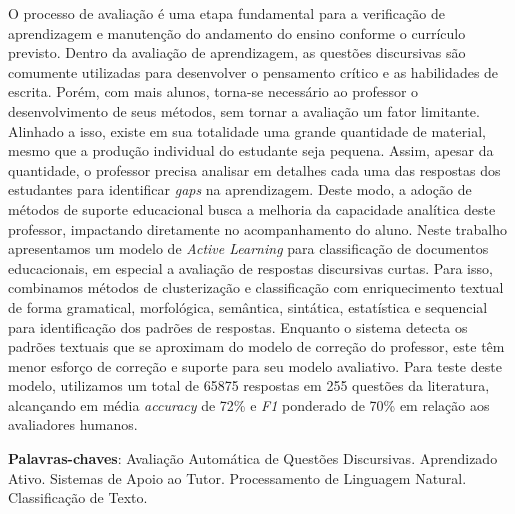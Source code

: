 O processo de avaliação é uma etapa fundamental para a verificação de aprendizagem e manutenção do andamento do ensino conforme o currículo previsto. Dentro da avaliação de aprendizagem, as questões discursivas são comumente utilizadas para desenvolver o pensamento crítico e as habilidades de escrita. Porém, com mais alunos, torna-se necessário ao professor o desenvolvimento de seus métodos, sem tornar a avaliação um fator limitante. Alinhado a isso, existe em sua totalidade uma grande quantidade de material, mesmo que a produção individual do estudante seja pequena. Assim, apesar da quantidade, o professor precisa analisar em detalhes cada uma das respostas dos estudantes para identificar \textit{gaps} na aprendizagem. Deste modo, a adoção de métodos de suporte educacional busca a melhoria da capacidade analítica deste professor, impactando diretamente no acompanhamento do aluno. Neste trabalho apresentamos um modelo de \textit{Active Learning} para classificação de documentos educacionais, em especial a avaliação de respostas discursivas curtas. Para isso, combinamos métodos de clusterização e classificação com enriquecimento textual de forma gramatical, morfológica, semântica, sintática, estatística e sequencial para identificação dos padrões de respostas. Enquanto o sistema detecta os padrões textuais que se aproximam do modelo de correção do professor, este têm menor esforço de correção e suporte para seu modelo avaliativo. Para teste deste modelo, utilizamos um total de 65875 respostas em 255 questões da literatura, alcançando em média \textit{accuracy} de 72\% e \textit{F1} ponderado de 70\% em relação aos avaliadores humanos.


\textbf{Palavras-chaves}: Avaliação Automática de Questões Discursivas. Aprendizado Ativo. Sistemas de Apoio ao Tutor. Processamento de Linguagem Natural. Classificação de Texto.